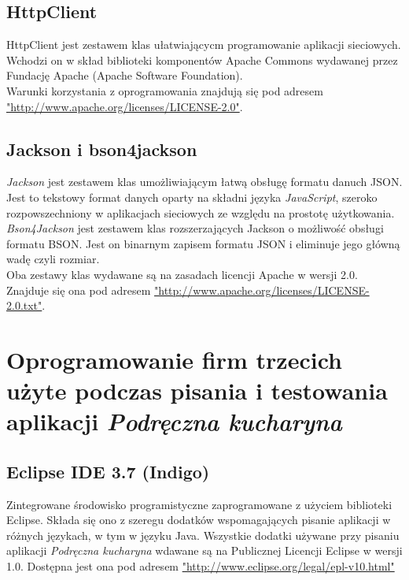 \documentclass[12pt,leqno, twoside]{mwart}
\begin{document}
\subsection{HttpClient}
HttpClient jest zestawem klas ułatwiającycm programowanie aplikacji sieciowych.
Wchodzi on w skład biblioteki komponentów Apache Commons wydawanej przez Fundację Apache (Apache Software Foundation). \\
Warunki korzystania z oprogramowania znajdują się pod adresem \url{"http://www.apache.org/licenses/LICENSE-2.0"}.
\subsection{Jackson i bson4jackson}
\emph{Jackson} jest zestawem klas umożliwiającym łatwą obsługę formatu danuch JSON.
Jest to tekstowy format danych oparty na składni języka \emph{JavaScript}, szeroko rozpowszechniony w aplikacjach sieciowych ze względu na prostotę użytkowania. \\
\emph{Bson4Jackson} jest zestawem klas rozszerzających Jackson o możliwość obsługi formatu BSON.
Jest on binarnym zapisem formatu JSON i eliminuje jego główną wadę czyli rozmiar.\\
Oba zestawy klas wydawane są na zasadach licencji Apache w wersji 2.0.
Znajduje się ona pod adresem \url{"http://www.apache.org/licenses/LICENSE-2.0.txt"}.
\section{Oprogramowanie firm trzecich użyte podczas pisania i testowania aplikacji \emph{Podręczna kucharyna}}
\subsection{Eclipse IDE 3.7 (Indigo)}
Zintegrowane środowisko programistyczne zaprogramowane z użyciem biblioteki Eclipse. Składa się ono z szeregu dodatków wspomagających pisanie aplikacji w różnych językach, w tym w języku Java. Wszystkie dodatki używane przy pisaniu aplikacji \emph{Podręczna kucharyna} wdawane są na Publicznej Licencji Eclipse w wersji 1.0.
Dostępna jest ona pod adresem \url{"http://www.eclipse.org/legal/epl-v10.html"}
\end{document}
